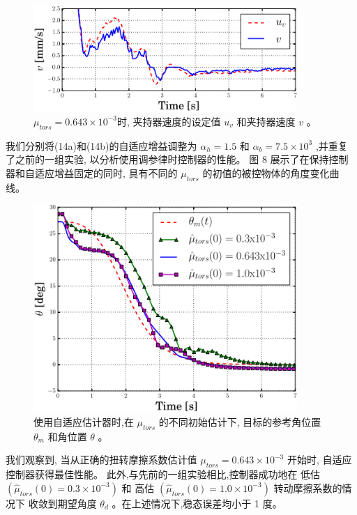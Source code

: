 \begin{figure}[!ht]
  \centering
  \includegraphics[width=10cm]{appendices/pic/5-4}
  \caption*{
    ${\mu _{tors}} = 0.643 \times {10^{ - 3}}$时,
    夹持器速度的设定值 $u_v$ 和夹持器速度 $v$ 。}
  \vspace{-0.3cm}
\end{figure}



我们分别将(14a)和(14b)的自适应增益调整为 ${\alpha _h} = 1.5$ 和
${\alpha _b} = 7.5 \times {10^3}$ ,并重复了之前的一组实验,
以分析使用调参律时控制器的性能。
图 8 展示了在保持控制器和自适应增益固定的同时,
具有不同的 $\mu_{tors}$ 的初值的被控物体的角度变化曲线。

\begin{figure}[!ht]
  \centering
  \includegraphics[width=10cm]{appendices/pic/5-5}
  \caption*{
    使用自适应估计器时,在 $\mu_{tors}$ 的不同初始估计下,
    目标的参考角位置 $\theta_m$ 和角位置 $\theta$ 。}
  \vspace{-0.3cm}
\end{figure}


我们观察到,
当从正确的扭转摩擦系数估计值 ${\mu _{tors}} = 0.643 \times {10^{ - 3}}$ 开始时,
自适应控制器获得最佳性能。
此外,与先前的一组实验相比,控制器成功地在
低估$({\hat \mu _{tors}}(0) = 0.3 \times {10^{ - 3}})$ 和
高估 $({\hat \mu _{tors}}(0) = 1.0 \times {10^{ - 3}})$ 转动摩擦系数的情况下
收敛到期望角度 $\theta_d$ 。在上述情况下,稳态误差均小于 1 度。

